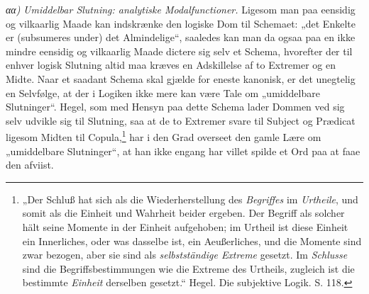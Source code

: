 \documentclass[12pt]{book}
\newcommand{\opage}[1]{\marginnote{\footnotesize\textit{[#1]}}}
\begin{document}
\textit{αα)} \emph{Umiddelbar Slutning: analytiske Modalfunctioner.}
Ligesom man paa eensidig og vilkaarlig Maade
kan indskrænke den logiske Dom til Schemaet: „det Enkelte
er (subsumeres under) det Almindelige“, saaledes kan man da
ogsaa paa en ikke mindre eensidig og vilkaarlig Maade dictere
sig selv et Schema, hvorefter der til enhver logisk Slutning
altid maa kræves en Adskillelse af to Extremer og en Midte.
Naar et saadant Schema skal gjælde for eneste kanonisk, er
det unegtelig en Selvfølge, at der i Logiken ikke mere kan
være Tale om „umiddelbare Slutninger“. Hegel, som med
Hensyn paa dette Schema lader Dommen ved sig selv udvikle
sig til Slutning, saa at de to Extremer svare til Subject
og Prædicat ligesom Midten til Copula,\footnote{„Der Schluß hat sich als die Wiederherstellung des \emph{Begriffes} im
\emph{Urtheile}, und somit als die Einheit und Wahrheit beider ergeben.
Der Begriff als solcher hält seine Momente in der Einheit
aufgehoben; im Urtheil ist diese Einheit ein Innerliches, oder was
dasselbe ist, ein Aeußerliches, und die Momente sind zwar bezogen,
aber sie sind als \emph{selbstständige Extreme} gesetzt. Im \emph{Schlusse}
sind die Begriffsbestimmungen wie die Extreme des Urtheils, zugleich
ist die bestimmte \emph{Einheit} derselben gesetzt.“ Hegel. Die
subjektive Logik. S. 118.}%
har i den Grad
\opage{295}overseet den gamle Lære om „umiddelbare Slutninger“, at
han ikke engang har villet spilde et Ord paa at faae den afviist.
\end{document}

